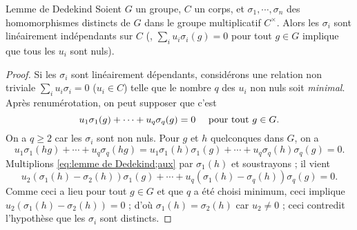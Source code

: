 \documentclass[11pt, %
  title in boldface,
  theorem in new line,
  theorem numbering = section,
  number theorems separately,
  simple name,
]{beaulivre}
\begin{document}
    \smallskip
    \begin{theorem-with-name}{Lemme de Dedekind}
        Soient \( G \) un groupe, \( C \) un corps, et \( \sigma_1, \cdots, \sigma_n \) des homomorphismes distincts de \( G \) dans le groupe multiplicatif \( C^\times \). Alors les \( \sigma_i \) sont linéairement indépendants sur \( C \) (\ie, \( \sum_{i} u_i \sigma_i(g) = 0 \) pour tout \( g \in G \) implique que tous les \( u_i \) sont nuls).
    \end{theorem-with-name}
    \begin{proof}
        Si les \( \sigma_i \) sont linéairement dépendants, considérons une relation non triviale \( \sum_i u_i \sigma_i = 0 \) (\( u_i \in C \)) telle que le nombre \( q \) des \( u_i \) non nuls soit \emph{minimal}. Après renumérotation, on peut supposer que c'est
        \begin{equation}\label{eq:lemme de Dedekind;aux}
            u_1 \sigma_1(g) + \cdots + u_q \sigma_q(g) = 0 \quad \text{ pour tout \( g \in G \).}
        \end{equation}
        On a \( q \geqslant 2 \) car les \( \sigma_i \) sont non nuls. Pour \( g \) et \( h \) quelconques dans \( G \), on a
        \[
            u_1 \sigma_1(hg) + \cdots + u_q \sigma_q(hg) = u_1 \sigma_1(h)\sigma_1(g) + \cdots + u_q \sigma_q(h)\sigma_q(g) = 0.
        \]
        Multiplions \eqref{eq:lemme de Dedekind;aux} par \( \sigma_1(h) \) et soustrayons ; il vient
        \[
            u_2 (\sigma_1(h)-\sigma_2(h))\sigma_1(g) + \cdots + u_q (\sigma_1(h)-\sigma_q(h))\sigma_q(g) = 0.
        \]
        Comme ceci a lieu pour tout \( g \in G \) et que \( q \) a été choisi minimum, ceci implique \( u_2(\sigma_1(h)-\sigma_2(h)) = 0 \) ; d'où \( \sigma_1(h) = \sigma_2(h) \) car \( u_2 \neq 0 \) ; ceci contredit l'hypothèse que les \( \sigma_i \) sont distincts.
    \end{proof}

    \medskip
\end{document}
